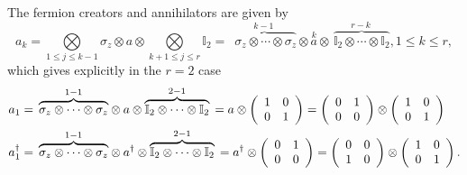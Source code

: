 \documentclass[aps,preprint]{revtex4}%
\begin{document}
The fermion creators and annihilators are given by%
\begin{equation}
a_{k}=%
{\displaystyle\bigotimes\limits_{1\leq j\leq k-1}}
\mathbb{\sigma}_{z}\otimes a\otimes%
{\displaystyle\bigotimes\limits_{k+1\leq j\leq r}}
\mathbb{I}_{2}=\,\overset{k-1}{\,\overbrace{\,\mathbb{\sigma}_{z}\otimes
\cdots\otimes\mathbb{\sigma}_{z}}}\otimes\overset{k}{a}\otimes
\overset{r-k}{\,\overbrace{\mathbb{I}_{2}\otimes\cdots\otimes\mathbb{I}_{2}}%
},1\leq k\leq r,\nonumber
\end{equation}
which gives explicitly in the $r=2$ case
\begin{align}
a_{1}  &  =\,\overset{1-1}{\overbrace{\mathbb{\sigma}_{z}\otimes\cdots
\otimes\mathbb{\sigma}_{z}}}\otimes a\otimes
\overset{2-1}{\overbrace{\mathbb{I}_{2}\otimes\cdots\otimes\mathbb{I}_{2}}%
}\,=a\otimes\left(
\begin{array}
[c]{cc}%
1 & 0\\
0 & 1
\end{array}
\right)  =\left(
\begin{array}
[c]{cc}%
0 & 1\\
0 & 0
\end{array}
\right)  \otimes\left(
\begin{array}
[c]{cc}%
1 & 0\\
0 & 1
\end{array}
\right) \\
a_{1}^{\dagger}  &  =\,\overset{1-1}{\overbrace{\mathbb{\sigma}_{z}%
\otimes\cdots\otimes\mathbb{\sigma}_{z}}}\otimes a^{\dagger}\otimes
\overset{2-1}{\overbrace{\mathbb{I}_{2}\otimes\cdots\otimes\mathbb{I}_{2}}%
}\,=a^{\dagger}\otimes\left(
\begin{array}
[c]{cc}%
0 & 1\\
0 & 0
\end{array}
\right)  =\left(
\begin{array}
[c]{cc}%
0 & 0\\
1 & 0
\end{array}
\right)  \otimes\left(
\begin{array}
[c]{cc}%
1 & 0\\
0 & 1
\end{array}
\right)  .
\end{align}%
\end{document}
